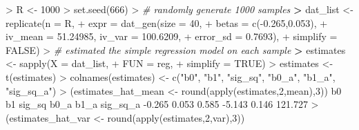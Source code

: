 \documentclass[
]{article}
\newenvironment{Shaded}{\begin{snugshade}}{\end{snugshade}}
\newcommand{\AttributeTok}[1]{\textcolor[rgb]{0.77,0.63,0.00}{#1}}
\newcommand{\CommentTok}[1]{\textcolor[rgb]{0.56,0.35,0.01}{\textit{#1}}}
\newcommand{\ConstantTok}[1]{\textcolor[rgb]{0.00,0.00,0.00}{#1}}
\newcommand{\DecValTok}[1]{\textcolor[rgb]{0.00,0.00,0.81}{#1}}
\newcommand{\ErrorTok}[1]{\textcolor[rgb]{0.64,0.00,0.00}{\textbf{#1}}}
\newcommand{\FloatTok}[1]{\textcolor[rgb]{0.00,0.00,0.81}{#1}}
\newcommand{\FunctionTok}[1]{\textcolor[rgb]{0.00,0.00,0.00}{#1}}
\newcommand{\NormalTok}[1]{#1}
\newcommand{\OtherTok}[1]{\textcolor[rgb]{0.56,0.35,0.01}{#1}}
\newcommand{\SpecialCharTok}[1]{\textcolor[rgb]{0.00,0.00,0.00}{#1}}
\newcommand{\StringTok}[1]{\textcolor[rgb]{0.31,0.60,0.02}{#1}}
\begin{document}
\begin{Shaded}
\begin{Highlighting}[]
\SpecialCharTok{\textgreater{}}\NormalTok{ R }\OtherTok{\textless{}{-}} \DecValTok{1000}
\SpecialCharTok{\textgreater{}} \FunctionTok{set.seed}\NormalTok{(}\DecValTok{666}\NormalTok{)}
\SpecialCharTok{\textgreater{}} \CommentTok{\# randomly generate 1000 samples}
\ErrorTok{\textgreater{}}\NormalTok{ dat\_list }\OtherTok{\textless{}{-}} \FunctionTok{replicate}\NormalTok{(}\AttributeTok{n =}\NormalTok{ R,}
\SpecialCharTok{+}                       \AttributeTok{expr =} \FunctionTok{dat\_gen}\NormalTok{(}\AttributeTok{size =} \DecValTok{40}\NormalTok{,}
\SpecialCharTok{+}                                      \AttributeTok{betas =} \FunctionTok{c}\NormalTok{(}\SpecialCharTok{{-}}\FloatTok{0.265}\NormalTok{,}\FloatTok{0.053}\NormalTok{),}
\SpecialCharTok{+}                                      \AttributeTok{iv\_mean =} \FloatTok{51.24985}\NormalTok{, }\AttributeTok{iv\_var =} \FloatTok{100.6209}\NormalTok{,}
\SpecialCharTok{+}                                      \AttributeTok{error\_sd =} \FloatTok{0.7693}\NormalTok{),}
\SpecialCharTok{+}                       \AttributeTok{simplify =} \ConstantTok{FALSE}\NormalTok{)}
\SpecialCharTok{\textgreater{}} \CommentTok{\# estimated the simple regression model on each sample}
\ErrorTok{\textgreater{}}\NormalTok{ estimates }\OtherTok{\textless{}{-}} \FunctionTok{sapply}\NormalTok{(}\AttributeTok{X =}\NormalTok{ dat\_list,}
\SpecialCharTok{+}                     \AttributeTok{FUN =}\NormalTok{ reg,}
\SpecialCharTok{+}                     \AttributeTok{simplify =} \ConstantTok{TRUE}\NormalTok{)}
\SpecialCharTok{\textgreater{}}\NormalTok{ estimates }\OtherTok{\textless{}{-}} \FunctionTok{t}\NormalTok{(estimates)}
\SpecialCharTok{\textgreater{}} \FunctionTok{colnames}\NormalTok{(estimates) }\OtherTok{\textless{}{-}} \FunctionTok{c}\NormalTok{(}\StringTok{"b0"}\NormalTok{, }\StringTok{"b1"}\NormalTok{, }\StringTok{"sig\_sq"}\NormalTok{, }\StringTok{"b0\_a"}\NormalTok{, }\StringTok{"b1\_a"}\NormalTok{, }\StringTok{"sig\_sq\_a"}\NormalTok{)}
\SpecialCharTok{\textgreater{}}\NormalTok{ (estimates\_hat\_mean }\OtherTok{\textless{}{-}} \FunctionTok{round}\NormalTok{(}\FunctionTok{apply}\NormalTok{(estimates,}\DecValTok{2}\NormalTok{,mean),}\DecValTok{3}\NormalTok{))}
\NormalTok{      b0       b1   sig\_sq     b0\_a     b1\_a sig\_sq\_a }
  \SpecialCharTok{{-}}\FloatTok{0.265}    \FloatTok{0.053}    \FloatTok{0.585}   \SpecialCharTok{{-}}\FloatTok{5.143}    \FloatTok{0.146}  \FloatTok{121.727} 
\SpecialCharTok{\textgreater{}}\NormalTok{ (estimates\_hat\_var }\OtherTok{\textless{}{-}} \FunctionTok{round}\NormalTok{(}\FunctionTok{apply}\NormalTok{(estimates,}\DecValTok{2}\NormalTok{,var),}\DecValTok{3}\NormalTok{))}

\end{Highlighting}
\end{Shaded}
\end{document}
